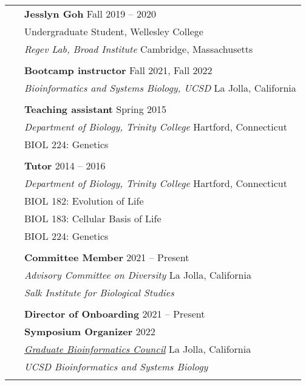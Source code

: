 \documentclass[letterpaper, 11pt]{article}
\begin{document}
\begin{longtable}{p{1.6in}p{4.9in}}
& \textbf{Jesslyn Goh} \hfill Fall 2019 -- 2020 \\
& Undergraduate Student, Wellesley College \\
& \textit{Regev Lab, Broad Institute} \hfill Cambridge, Massachusetts \\
& \\
  

{\color{OliveGreen}{Teaching}} 
& \textbf{Bootcamp instructor} \hfill Fall 2021, Fall 2022 \\\
& \textit{Bioinformatics and Systems Biology, UCSD} \hfill La Jolla, California \\
& \\

& \textbf{Teaching assistant} \hfill Spring 2015 \\
& \textit{Department of Biology, Trinity College} \hfill Hartford, Connecticut \\
& BIOL 224: Genetics \\
& \\

& \textbf{Tutor} \hfill 2014 -- 2016 \\
& \textit{Department of Biology, Trinity College} \hfill Hartford, Connecticut \\
& BIOL 182: Evolution of Life \\
& BIOL 183: Cellular Basis of Life \\
& BIOL 224: Genetics \\
& \\



{\color{OliveGreen}{Service / Outreach}}
& \textbf{Committee Member} \hfill 2021 -- Present \\
& \textit{Advisory Committee on Diversity} \hfill La Jolla, California \\
& \textit{Salk Institute for Biological Studies} \\
& \\

& \textbf{Director of Onboarding} \hfill 2021 -- Present \\
& \textbf{Symposium Organizer} \hfill 2022 \\
& \href{https://gbic.ucsd.edu/}{\textit{Graduate Bioinformatics Council}} \hfill La Jolla, California \\
& \textit{UCSD Bioinformatics and Systems Biology} \\
& \\


\end{longtable}
\end{document}
